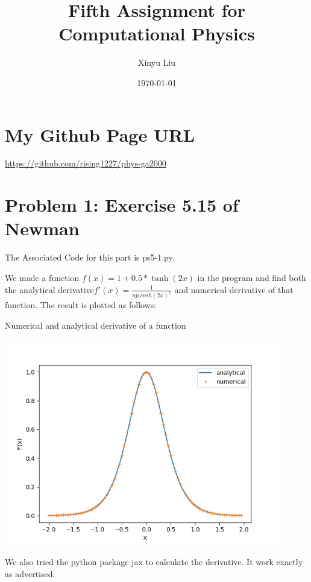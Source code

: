 \documentclass[letterpaper,12pt]{article}
\title{Fifth Assignment for Computational Physics}
\date{\today}
\author{Xinyu Liu}
\begin{document}
\maketitle
\tableofcontents

\newpage

\section{My Github Page URL}
\url{https://github.com/rising1227/phys-ga2000}

\section{Problem 1: Exercise 5.15 of Newman}

The Associated Code for this part is ps5-1.py.

We made a function $f(x) = 1 + 0.5* \tanh(2x)$ in the program and find both the analytical derivative$f'(x) = \frac{1}{np.cosh(2x)^2}$ and numerical derivative of that function. The result is plotted as follows:

\begin{table}[!h]
    \centering
    \caption{Numerical and analytical derivative of a function}
    \includegraphics[width=12cm]{ps5-1-1.png}
\end{table}%

We also tried the python package jax to calculate the derivative. It work exactly as advertised:
\end{document}
